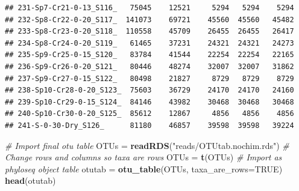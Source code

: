 \documentclass[]{article}
\newenvironment{Shaded}{\begin{snugshade}}{\end{snugshade}}
\newcommand{\CommentTok}[1]{\textcolor[rgb]{0.56,0.35,0.01}{\textit{#1}}}
\newcommand{\DataTypeTok}[1]{\textcolor[rgb]{0.13,0.29,0.53}{#1}}
\newcommand{\KeywordTok}[1]{\textcolor[rgb]{0.13,0.29,0.53}{\textbf{#1}}}
\newcommand{\NormalTok}[1]{#1}
\newcommand{\OtherTok}[1]{\textcolor[rgb]{0.56,0.35,0.01}{#1}}
\newcommand{\StringTok}[1]{\textcolor[rgb]{0.31,0.60,0.02}{#1}}
\begin{document}
\begin{verbatim}
## 231-Sp7-Cr21-0-13_S116_   75045    12521     5294   5294    5294
## 232-Sp8-Cr22-0-20_S117_  141073    69721    45560  45560   45482
## 233-Sp8-Cr23-0-20_S118_  110558    45709    26455  26455   26417
## 234-Sp8-Cr24-0-20_S119_   61465    37231    24321  24321   24273
## 235-Sp9-Cr25-0-15_S120_   83784    41544    22254  22254   22165
## 236-Sp9-Cr26-0-20_S121_   80446    48274    32007  32007   31862
## 237-Sp9-Cr27-0-15_S122_   80498    21827     8729   8729    8729
## 238-Sp10-Cr28-0-20_S123_  75603    36729    24170  24170   24160
## 239-Sp10-Cr29-0-15_S124_  84146    43982    30468  30468   30468
## 240-Sp10-Cr30-0-20_S125_  85612    12867     4856   4856    4856
## 241-S-0-30-Dry_S126_      81180    46857    39598  39598   39224
\end{verbatim}

\begin{Shaded}
\begin{Highlighting}[]
\CommentTok{# Import final otu table}
\NormalTok{OTUs =}\StringTok{ }\KeywordTok{readRDS}\NormalTok{(}\StringTok{"reads/OTUtab.nochim.rds"}\NormalTok{)}
\CommentTok{# Change rows and columns so taxa are rows}
\NormalTok{OTUs =}\StringTok{ }\KeywordTok{t}\NormalTok{(OTUs)}
\CommentTok{# Import as phyloseq object table}
\NormalTok{otutab =}\StringTok{ }\KeywordTok{otu_table}\NormalTok{(OTUs, }\DataTypeTok{taxa_are_rows=}\OtherTok{TRUE}\NormalTok{)}
\KeywordTok{head}\NormalTok{(otutab)}
\end{Highlighting}
\end{Shaded}
\end{document}
